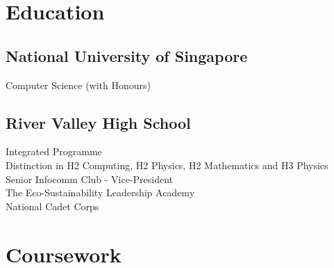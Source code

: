 \documentclass[a4paper,hidelinks]{resume} %
\begin{document}
\begin{minipage}[t]{0.44\textwidth} %

    
    \section{Education}
    
    \sectionspace %
    
    \subsection{National University of Singapore}
    
     {Computer Science (with Honours)} \\
    
    \sectionspace %
    
    \subsection{River Valley High School}
    
     {Integrated Programme} \\
    Distinction in H2 Computing, H2 Physics, H2 Mathematics and H3 Physics \\
    Senior Infocomm Club - Vice-President \\
    The Eco-Sustainability Leadership Academy  \\
    National Cadet Corps \\
    
    \sectionspace %
    
    
    \section{Coursework}
    
    \sectionspace %
    
    

\end{minipage}
\end{document}
